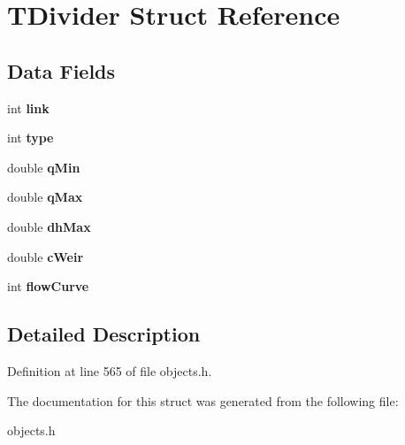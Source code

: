 \hypertarget{struct_t_divider}{}\section{T\+Divider Struct Reference}
\label{struct_t_divider}
\subsection*{Data Fields}
\begin{DoxyCompactItemize}
\item 
\mbox{\label{struct_t_divider_af203a1810ce3b44e2b2219c63e0ceff9}} 
int {\bfseries link}
\item 
\mbox{\label{struct_t_divider_ac765329451135abec74c45e1897abf26}} 
int {\bfseries type}
\item 
\mbox{\label{struct_t_divider_a8729eaa476d785b3bafd5c1cbf0cd554}} 
double {\bfseries q\+Min}
\item 
\mbox{\label{struct_t_divider_a1e9074679d06c29cfa780c9773f82861}} 
double {\bfseries q\+Max}
\item 
\mbox{\label{struct_t_divider_a4766ef2eeff9b4f7004408df504b109c}} 
double {\bfseries dh\+Max}
\item 
\mbox{\label{struct_t_divider_a315b35861916f9b9640b2c6e63a8b47b}} 
double {\bfseries c\+Weir}
\item 
\mbox{\label{struct_t_divider_a3e296f9a9342293292c36ba87c7d3d97}} 
int {\bfseries flow\+Curve}
\end{DoxyCompactItemize}


\subsection{Detailed Description}


Definition at line 565 of file objects.\+h.



The documentation for this struct was generated from the following file\+:\begin{DoxyCompactItemize}
\item 
objects.\+h\end{DoxyCompactItemize}
